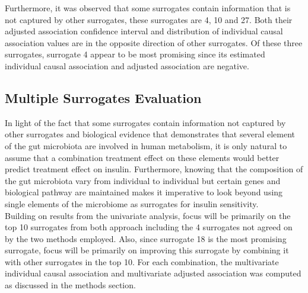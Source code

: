 \documentclass[a4paper,12pt]{article}
\begin{document}
	Furthermore, it was observed that some surrogates contain information that is not captured by other surrogates, these surrogates are 4, 10 and 27. Both their adjusted association confidence interval and distribution of individual causal association values are in the opposite direction of other surrogates. Of these three surrogates, surrogate 4 appear to be most promising since its estimated individual causal association and adjusted association are negative.
	
	\subsection{Multiple Surrogates Evaluation}
	In light of the fact that some surrogates contain information not captured by other surrogates and biological evidence\citep{Vrieze, microbiome101, healthymicrobiome} that demonstrates that several element of the gut microbiota are involved in human metabolism, it is only natural to assume that a combination treatment effect on these elements would better predict  treatment effect on insulin. Furthermore, knowing that the composition of the gut microbiota vary from individual to individual but certain genes and biological pathway are maintained makes it imperative to look beyond using single elements of the microbiome as surrogates for insulin sensitivity.\\
	
	Building on results from the univariate analysis, focus will be primarily on the top 10 surrogates from both approach including the 4 surrogates not agreed on by the two methods employed. Also, since surrogate 18 is the most promising surrogate, focus will be primarily on improving this surrogate by combining it with other surrogates in the top 10. For each combination, the multivariate individual causal association and multivariate adjusted association was computed as discussed in the methods section.
	
\end{document}
